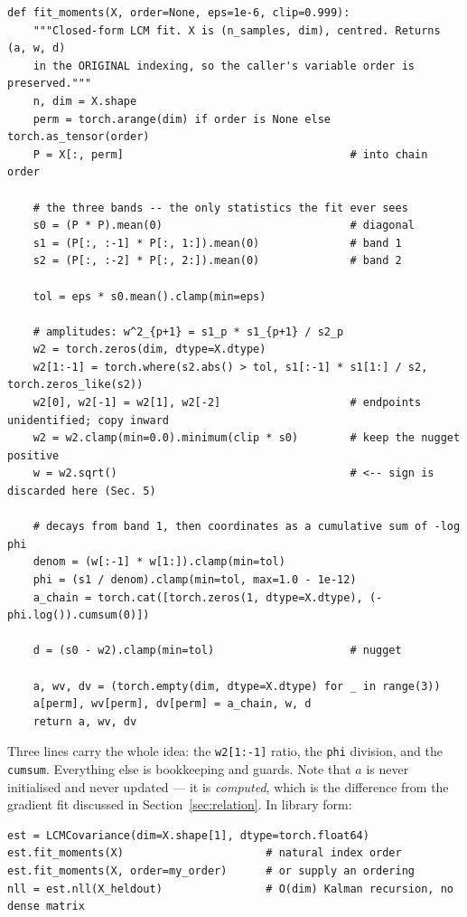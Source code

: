 \documentclass[11pt,a4paper]{article}
\newcommand{\code}[1]{\texttt{#1}}
\begin{document}
\begin{lstlisting}[style=py,caption={The closed-form fit in full.},label={lst:fit},float=htbp]
def fit_moments(X, order=None, eps=1e-6, clip=0.999):
    """Closed-form LCM fit. X is (n_samples, dim), centred. Returns (a, w, d)
    in the ORIGINAL indexing, so the caller's variable order is preserved."""
    n, dim = X.shape
    perm = torch.arange(dim) if order is None else torch.as_tensor(order)
    P = X[:, perm]                                   # into chain order

    # the three bands -- the only statistics the fit ever sees
    s0 = (P * P).mean(0)                             # diagonal
    s1 = (P[:, :-1] * P[:, 1:]).mean(0)              # band 1
    s2 = (P[:, :-2] * P[:, 2:]).mean(0)              # band 2

    tol = eps * s0.mean().clamp(min=eps)

    # amplitudes: w^2_{p+1} = s1_p * s1_{p+1} / s2_p
    w2 = torch.zeros(dim, dtype=X.dtype)
    w2[1:-1] = torch.where(s2.abs() > tol, s1[:-1] * s1[1:] / s2, torch.zeros_like(s2))
    w2[0], w2[-1] = w2[1], w2[-2]                    # endpoints unidentified; copy inward
    w2 = w2.clamp(min=0.0).minimum(clip * s0)        # keep the nugget positive
    w = w2.sqrt()                                    # <-- sign is discarded here (Sec. 5)

    # decays from band 1, then coordinates as a cumulative sum of -log phi
    denom = (w[:-1] * w[1:]).clamp(min=tol)
    phi = (s1 / denom).clamp(min=tol, max=1.0 - 1e-12)
    a_chain = torch.cat([torch.zeros(1, dtype=X.dtype), (-phi.log()).cumsum(0)])

    d = (s0 - w2).clamp(min=tol)                     # nugget

    a, wv, dv = (torch.empty(dim, dtype=X.dtype) for _ in range(3))
    a[perm], wv[perm], dv[perm] = a_chain, w, d
    return a, wv, dv
\end{lstlisting}

Three lines carry the whole idea: the \code{w2[1:-1]} ratio, the \code{phi} division, and the
\code{cumsum}. Everything else is bookkeeping and guards. Note that $a$ is never initialised
and never updated --- it is \emph{computed}, which is the difference from the gradient fit
discussed in Section~\ref{sec:relation}. In library form:

\begin{lstlisting}[style=py]
est = LCMCovariance(dim=X.shape[1], dtype=torch.float64)
est.fit_moments(X)                      # natural index order
est.fit_moments(X, order=my_order)      # or supply an ordering
nll = est.nll(X_heldout)                # O(dim) Kalman recursion, no dense matrix
\end{lstlisting}
\end{document}
